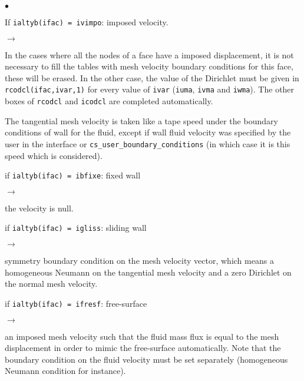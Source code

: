 \begin{list}{$\bullet$}{}

\item If \texttt{ialtyb(ifac) = ivimpo}: imposed velocity.

\begin{list}{$\rightarrow$}{}
\item In the cases where all the nodes of a face have a imposed displacement,
 it is not necessary to fill the tables with mesh velocity boundary conditions
 for this face, these will be erased. In the other case,
 the value of the Dirichlet must be given in \texttt{rcodcl(ifac,ivar,1)} for
 every value of \texttt{ivar} (\texttt{iuma}, \texttt{ivma} and \texttt{iwma}).
 The other boxes of \texttt{rcodcl} and \texttt{icodcl} are completed automatically.

 The tangential mesh velocity is taken like a tape speed under the
 boundary conditions of wall for the fluid, except if wall fluid velocity
 was specified by the user in the interface or \texttt{cs\_user\_boundary\_conditions} (in which case
 it is this speed which is considered).
\end{list}

 \item if \texttt{ialtyb(ifac) = ibfixe}: fixed wall
\begin{list}{$\rightarrow$}{}
 \item the velocity is null.
\end{list}

 \item if \texttt{ialtyb(ifac) = igliss}: sliding wall
\begin{list}{$\rightarrow$}{}
\item symmetry boundary condition on the mesh velocity vector, which means a homogeneous Neumann on the tangential mesh velocity and a zero Dirichlet on the normal mesh velocity.
\end{list}

 \item if \texttt{ialtyb(ifac) = ifresf}: free-surface
\begin{list}{$\rightarrow$}{}
\item an imposed mesh velocity such that the fluid mass flux is equal to the mesh displacement in order to mimic the free-surface automatically. Note that the boundary condition on the fluid velocity must be set separately (homogeneous Neumann condition for instance).
\end{list}

\end{list}

